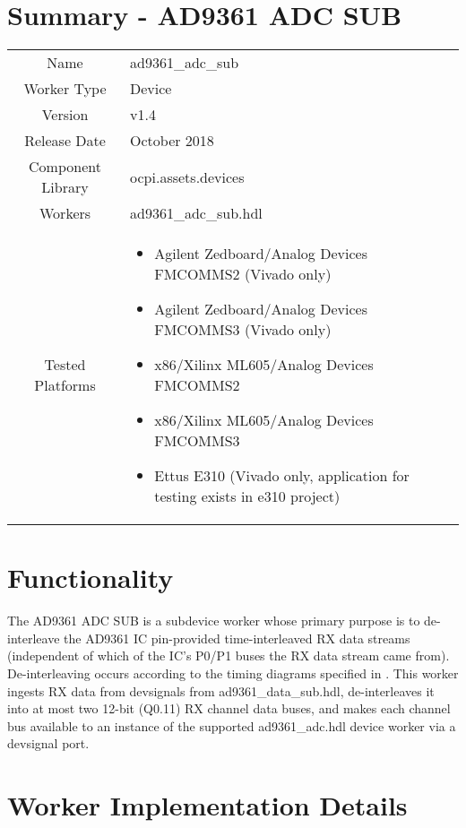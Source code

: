 \documentclass{article}
\author{} %
\date{Version \docVersion} %
\title{\docTitle}
\def\docVersion{1.4}
\def\comp{ad9361\_adc\_sub}
\def\Comp{AD9361 ADC SUB}
\begin{document}
\section*{Summary - \Comp}
\begin{tabular}{|c|M{13.5cm}|}
	\hline
	                  &                  \\
	\hline
	Name              & \comp            \\
	\hline
	Worker Type       & Device           \\
	\hline
	Version           & v\docVersion     \\
	\hline
	Release Date      & October 2018         \\
	\hline
	Component Library & ocpi.assets.devices     \\
	\hline
	Workers           & \comp.hdl        \\
	\hline
	Tested Platforms  &
\begin{itemize}
  \item Agilent Zedboard/Analog Devices FMCOMMS2 (Vivado only)
  \item Agilent Zedboard/Analog Devices FMCOMMS3 (Vivado only)
  \item x86/Xilinx ML605/Analog Devices FMCOMMS2
  \item x86/Xilinx ML605/Analog Devices FMCOMMS3
  \item Ettus E310 (Vivado only, application for testing exists in e310 project)
\end{itemize} \\
	\hline
\end{tabular}

\section*{Functionality}
	The \Comp{} is a subdevice worker whose primary purpose is to de-interleave the AD9361 IC pin-provided time-interleaved RX data streams (independent of which of the IC's P0/P1 buses the RX data stream came from). De-interleaving occurs according to the timing diagrams specified in \cite{adi_ug570}. This worker ingests RX data from devsignals from ad9361\_data\_sub.hdl\cite{data_sub_comp_datasheet}, de-interleaves it into at most two 12-bit (Q0.11) RX channel data buses, and makes each channel bus available to an instance of the supported ad9361\_adc.hdl device worker via a devsignal port.

\section*{Worker Implementation Details}
\end{document}
